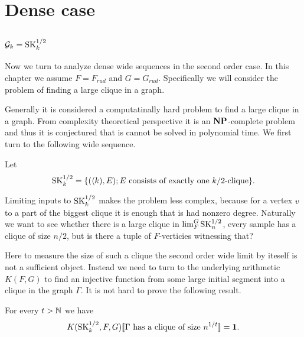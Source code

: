 \chapter{Dense case}\label{chapdense}

\section{$\mathcal{G}_k=\text{SK}_k^{1/2}$}

Now we turn to analyze dense wide sequences in the second order case. In this chapter we assume $F=F_{rud}$ and $G=G_{rud}$. Specifically we will consider the problem of finding a large clique in a graph. 

Generally it is considered a computatinally hard problem to find a large clique in a graph. From complexity theoretical perspective it is an $\textbf{NP}$-complete problem and thus it is conjectured that is cannot be solved in polynomial time. We first turn to the following wide sequence.

\begin{defi}
Let \[\text{SK}_k^{1/2}=\{(\langle k),E);\text{$E$ consists of exactly one $k/2$-clique}\}.\]
\end{defi}

Limiting inputs to $\text{SK}_k^{1/2}$ makes the problem less complex, because for a vertex $v$ to a part of the biggest clique it is enough that is had nonzero degree. Naturally we want to see whether there is a large clique in $\lim_F^G \text{SK}_n^{1/2}$, every sample has a clique of size $n/2$, but is there a tuple of $F$-verticies witnessing that? 

Here to measure the size of such a clique the second order wide limit  by iteself is not a sufficient object. Instead we need to turn to the underlying arithmetic $K(F,G)$ to find an injective function from some large initial segment into a clique in the graph $\Gamma$. It is not hard to prove the following result.

\begin{thrm}\label{thrmsk1}For every $t>\mathbb{N}$ we have
\[K(\text{SK}_k^{1/2},F,G)\llbracket\text{$\Gamma$ has a clique of size $n^{1/t}$}\rrbracket=\textbf{1}.\]

\end{thrm}

